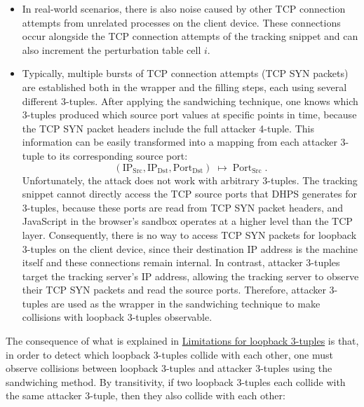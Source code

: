 \documentclass{report}
\begin{document}
\begin{itemize}
    \item {} In real-world scenarios, there is also \alert{noise} caused by other TCP connection attempts from unrelated processes on the client device. These connections occur alongside the TCP connection attempts of the tracking snippet and can also increment the perturbation table cell \( i \).
    \item {} Typically, multiple \alert{bursts of TCP connection attempts} (TCP SYN packets) are established both in the wrapper and the filling steps, each using several different 3-tuples. After applying the sandwiching technique, one knows which 3-tuples produced which source port values at specific points in time, because the \alert{TCP SYN packet headers} include the full attacker 4-tuple. This information can be easily transformed into a mapping from each attacker 3-tuple to its corresponding source port:
      \[
        (\mathrm{IP_{Src}}, \mathrm{IP_{Dst}}, \mathrm{Port_{Dst}}) \;\mapsto\; \mathrm{Port_{Src}}\;\text{.}
      \]
     Unfortunately, the attack does not work with arbitrary 3-tuples. The tracking snippet cannot directly access the TCP source ports that DHPS generates for 3-tuples, because these ports are read from TCP SYN packet headers, and JavaScript in the \alert{browser’s sandbox} operates at a higher level than the TCP layer. Consequently, there is no way to access TCP SYN packets for \alert{loopback 3-tuples} on the client device, since their destination IP address is the machine itself and these connections remain internal. In contrast, \alert{attacker 3-tuples} target the tracking server’s IP address, allowing the \alert{tracking server} to observe their TCP SYN packets and read the source ports. Therefore, attacker 3-tuples are used as the wrapper in the sandwiching technique to make collisions with loopback 3-tuples observable.
\end{itemize}

The consequence of what is explained in \hyperlink{limitations}{Limitations for loopback 3-tuples} is that, in order to detect which loopback 3-tuples collide with each other, one must observe \alert{collisions between loopback 3-tuples and attacker 3-tuples} using the sandwiching method. By transitivity, if two loopback 3-tuples each collide with the same attacker 3-tuple, then they also collide with each other:
\end{document}
